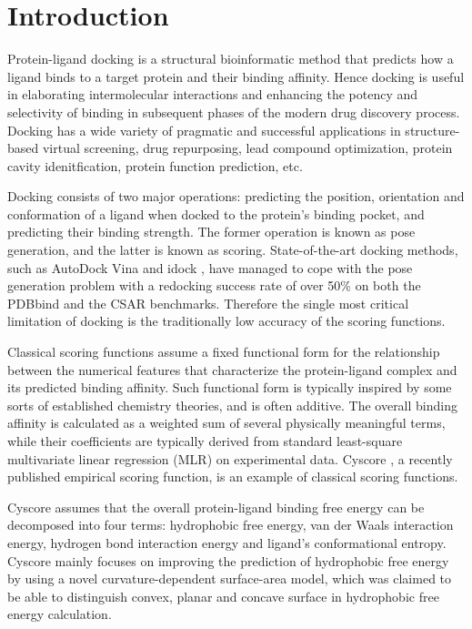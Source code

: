 \documentclass[journal=jacsat,manuscript=article]{achemso}
\begin{document}
\section{Introduction}

Protein-ligand docking is a structural bioinformatic method that predicts how a ligand binds to a target protein and their binding affinity. Hence docking is useful in elaborating intermolecular interactions and enhancing the potency and selectivity of binding in subsequent phases of the modern drug discovery process. Docking has a wide variety of pragmatic and successful applications in structure-based virtual screening, drug repurposing, lead compound optimization, protein cavity idenitfication, protein function prediction, etc.

Docking consists of two major operations: predicting the position, orientation and conformation of a ligand when docked to the protein's binding pocket, and predicting their binding strength. The former operation is known as pose generation, and the latter is known as scoring. State-of-the-art docking methods, such as AutoDock Vina \cite{595} and idock \cite{1153}, have managed to cope with the pose generation problem with a redocking success rate of over 50\% \cite{1362} on both the PDBbind \cite{529,530} and the CSAR \cite{857,960} benchmarks. Therefore the single most critical limitation of docking is the traditionally low accuracy of the scoring functions.

Classical scoring functions assume a fixed functional form for the relationship between the numerical features that characterize the protein-ligand complex and its predicted binding affinity. Such functional form is typically inspired by some sorts of established chemistry theories, and is often additive. The overall binding affinity is calculated as a weighted sum of several physically meaningful terms, while their coefficients are typically derived from standard least-square multivariate linear regression (MLR) on experimental data. Cyscore \cite{1372}, a recently published empirical scoring function, is an example of classical scoring functions.

Cyscore assumes that the overall protein-ligand binding free energy can be decomposed into four terms: hydrophobic free energy, van der Waals interaction energy, hydrogen bond interaction energy and ligand's conformational entropy. Cyscore mainly focuses on improving the prediction of hydrophobic free energy by using a novel curvature-dependent surface-area model, which was claimed to be able to distinguish convex, planar and concave surface in hydrophobic free energy calculation.
\end{document}
